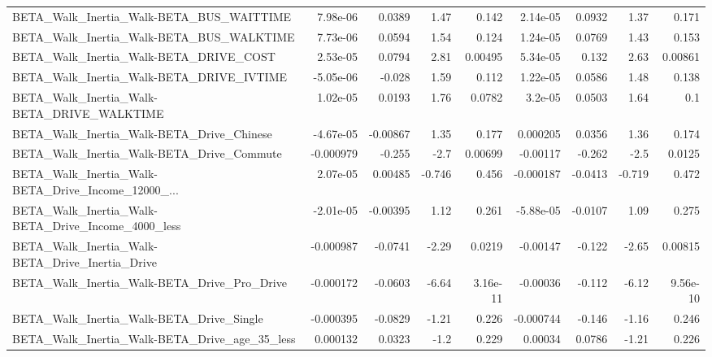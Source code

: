 \begin{tabular}{lrrrrrrrr}
BETA\_Walk\_Inertia\_Walk-BETA\_BUS\_WAITTIME           &    7.98e-06 &       0.0389 &     1.47 &    0.142 &   2.14e-05 &      0.0932 &         1.37 &         0.171 \\
BETA\_Walk\_Inertia\_Walk-BETA\_BUS\_WALKTIME           &    7.73e-06 &       0.0594 &     1.54 &    0.124 &   1.24e-05 &      0.0769 &         1.43 &         0.153 \\
BETA\_Walk\_Inertia\_Walk-BETA\_DRIVE\_COST             &    2.53e-05 &       0.0794 &     2.81 &  0.00495 &   5.34e-05 &       0.132 &         2.63 &       0.00861 \\
BETA\_Walk\_Inertia\_Walk-BETA\_DRIVE\_IVTIME           &   -5.05e-06 &       -0.028 &     1.59 &    0.112 &   1.22e-05 &      0.0586 &         1.48 &         0.138 \\
BETA\_Walk\_Inertia\_Walk-BETA\_DRIVE\_WALKTIME         &    1.02e-05 &       0.0193 &     1.76 &   0.0782 &    3.2e-05 &      0.0503 &         1.64 &           0.1 \\
BETA\_Walk\_Inertia\_Walk-BETA\_Drive\_Chinese          &   -4.67e-05 &     -0.00867 &     1.35 &    0.177 &   0.000205 &      0.0356 &         1.36 &         0.174 \\
BETA\_Walk\_Inertia\_Walk-BETA\_Drive\_Commute          &   -0.000979 &       -0.255 &     -2.7 &  0.00699 &   -0.00117 &      -0.262 &         -2.5 &        0.0125 \\
BETA\_Walk\_Inertia\_Walk-BETA\_Drive\_Income\_12000\_... &    2.07e-05 &      0.00485 &   -0.746 &    0.456 &  -0.000187 &     -0.0413 &       -0.719 &         0.472 \\
BETA\_Walk\_Inertia\_Walk-BETA\_Drive\_Income\_4000\_less &   -2.01e-05 &     -0.00395 &     1.12 &    0.261 &  -5.88e-05 &     -0.0107 &         1.09 &         0.275 \\
BETA\_Walk\_Inertia\_Walk-BETA\_Drive\_Inertia\_Drive    &   -0.000987 &      -0.0741 &    -2.29 &   0.0219 &   -0.00147 &      -0.122 &        -2.65 &       0.00815 \\
BETA\_Walk\_Inertia\_Walk-BETA\_Drive\_Pro\_Drive        &   -0.000172 &      -0.0603 &    -6.64 & 3.16e-11 &   -0.00036 &      -0.112 &        -6.12 &      9.56e-10 \\
BETA\_Walk\_Inertia\_Walk-BETA\_Drive\_Single           &   -0.000395 &      -0.0829 &    -1.21 &    0.226 &  -0.000744 &      -0.146 &        -1.16 &         0.246 \\
BETA\_Walk\_Inertia\_Walk-BETA\_Drive\_age\_35\_less      &    0.000132 &       0.0323 &     -1.2 &    0.229 &    0.00034 &      0.0786 &        -1.21 &         0.226 \\

\end{tabular}
